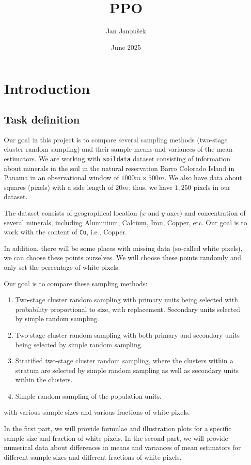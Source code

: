 \documentclass{article}
\title{PPO}
\author{Jan Janoušek}
\date{June 2025}
\begin{document}
\maketitle

\section{Introduction}
\subsection{Task definition}
Our goal in this project is to compare several sampling methods (two-stage cluster random sampling) and their sample means and variances of the mean estimators. We are working with \texttt{soildata} dataset consisting of information about minerals in the soil in the natural reservation Barro Colorado Island in Panama in an observational window of $1000m \times 500 m$. We also have data about squares (pixels) with a side length of $ 20 m$; thus, we have $1,250$ pixels in our dataset.


The dataset consists of geographical location ($x$ and $y$ axes) and concentration of several minerals, including Aluminium, Calcium, Iron, Copper, etc. Our goal is to work with the content of \texttt{Cu}, i.e., Copper.

In addition, there will be some places with missing data (so-called white pixels), we can choose these points ourselves. We will choose these points randomly and only set the percentage of white pixels.

Our goal is to compare these sampling methods:
\begin{enumerate}
    \item Two-stage cluster random sampling with primary units being selected with probability proportional to size, with replacement. Secondary units selected by simple random sampling.
    \item Two-stage cluster random sampling with both primary and secondary units being selected by simple random sampling.
    \item Stratified two-stage cluster random sampling, where the clusters within a stratum are selected by simple random sampling as well as secondary units within the clusters.
    \item Simple random sampling of the population units.
\end{enumerate}
with various sample sizes and various fractions of white pixels.

In the first part, we will provide formulae and illustration plots for a specific sample size and fraction of white pixels. In the second part, we will provide numerical data about differences in means and variances of mean estimators for different sample sizes and different fractions of white pixels.
\end{document}
